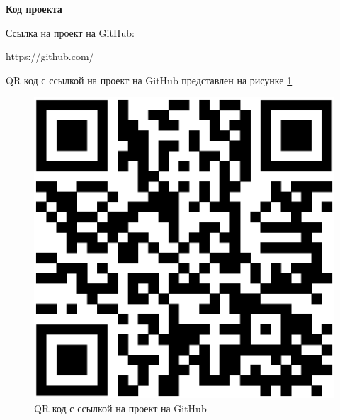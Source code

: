 \unhidefromtoc
{}
\hidefromtoc
\vspace{-0.5cm}
\centerline{\textbf{Код проекта}}

\vspace{0.5cm}

Ссылка на проект на GitHub:

https://github.com/\bigskip

QR код с ссылкой на проект на GitHub представлен на рисунке \ref{fig:qr_github}


\renewcommand{\thefigure}{Б.1}
\begin{figure}[ht]
    \centering
    \vspace{0ex}
    \includegraphics[width=0.6\linewidth]{imgs/qr_github.png}
    \caption{QR код с ссылкой на проект на GitHub}
    \label{fig:qr_github}
\end{figure}